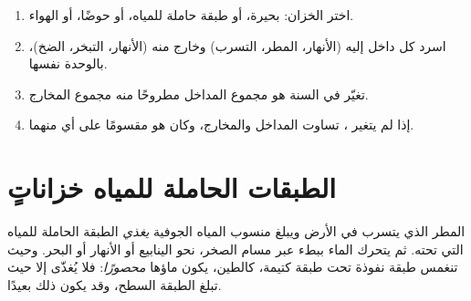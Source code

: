 \begin{method}\label{met:g10:freshwater-resources:budget}
\begin{enumerate}
  \item اختر الخزان: بحيرة، أو طبقة حاملة للمياه، أو حوضًا، أو الهواء.
  \item اسرد كل  داخل إليه (الأنهار، المطر، التسرب) وخارج منه
        (الأنهار، التبخر، الضخ)، بالوحدة نفسها.
  \item تغيّر  في السنة هو مجموع المداخل مطروحًا منه
        مجموع المخارج.
  \item إذا لم يتغير ، تساوت المداخل والمخارج، وكان  هو  مقسومًا على أي منهما.
\end{enumerate}
\end{method}

\section{الطبقات الحاملة للمياه خزاناتٍ}

المطر الذي يتسرب في الأرض ويبلغ منسوب المياه الجوفية \emph{يغذي}
الطبقة الحاملة للمياه التي تحته. ثم يتحرك الماء ببطء عبر مسام الصخر،
نحو الينابيع أو الأنهار أو البحر. وحيث تنغمس
طبقة نفوذة تحت طبقة كتيمة، كالطين، يكون ماؤها
\emph{محصورًا}: فلا يُغذّى إلا حيث تبلغ الطبقة السطح، وقد يكون ذلك
بعيدًا.

